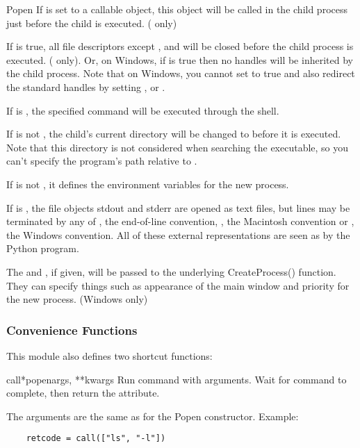 \begin{classdesc}{Popen}
If  is set to a callable object, this object will be
called in the child process just before the child is executed.
(\UNIX{} only)

If  is true, all file descriptors except ,
 and  will be closed before the child process is
executed. (\UNIX{} only).  Or, on Windows, if  is true
then no handles will be inherited by the child process.  Note that on
Windows, you cannot set  to true and also redirect the
standard handles by setting ,  or .

If  is , the specified command will be
executed through the shell.

If  is not , the child's current directory will be
changed to  before it is executed.  Note that this directory
is not considered when searching the executable, so you can't specify
the program's path relative to .

If  is not , it defines the environment variables
for the new process.

If  is , the file objects stdout
and stderr are opened as text files, but lines may be terminated by
any of , the \UNIX{} end-of-line convention, ,
the Macintosh convention or , the Windows convention.
All of these external representations are seen as  by the
Python program.  

The  and , if given, will be
passed to the underlying CreateProcess() function.  They can specify
things such as appearance of the main window and priority for the new
process.  (Windows only)
\end{classdesc}

\subsubsection{Convenience Functions}

This module also defines two shortcut functions:

\begin{funcdesc}{call}{*popenargs, **kwargs}
Run command with arguments.  Wait for command to complete, then
return the  attribute.

The arguments are the same as for the Popen constructor.  Example:

\begin{verbatim}
    retcode = call(["ls", "-l"])
\end{verbatim}
\end{funcdesc}

